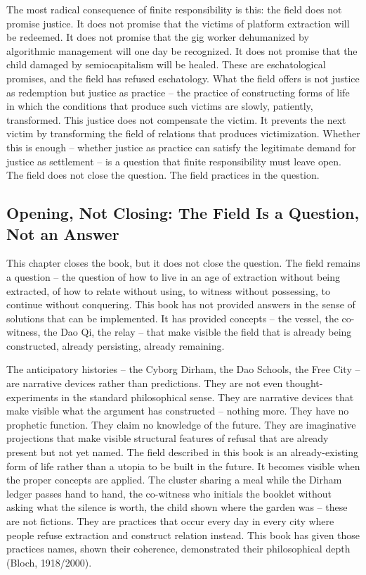 The most radical consequence of finite responsibility is this: the field does not promise justice. It does not promise that the victims of platform extraction will be redeemed. It does not promise that the gig worker dehumanized by algorithmic management will one day be recognized. It does not promise that the child damaged by semiocapitalism will be healed. These are eschatological promises, and the field has refused eschatology. What the field offers is not justice as redemption but justice as practice -- the practice of constructing forms of life in which the conditions that produce such victims are slowly, patiently, transformed. This justice does not compensate the victim. It prevents the next victim by transforming the field of relations that produces victimization. Whether this is enough -- whether justice as practice can satisfy the legitimate demand for justice as settlement -- is a question that finite responsibility must leave open. The field does not close the question. The field practices in the question.

\subsection{Opening, Not Closing: The Field Is a Question, Not an Answer}

This chapter closes the book, but it does not close the question. The field remains a question -- the question of how to live in an age of extraction without being extracted, of how to relate without using, to witness without possessing, to continue without conquering. This book has not provided answers in the sense of solutions that can be implemented. It has provided concepts -- the vessel, the co-witness, the Dao Qi, the relay -- that make visible the field that is already being constructed, already persisting, already remaining.

The anticipatory histories -- the Cyborg Dirham, the Dao Schools, the Free City -- are narrative devices rather than predictions. They are not even thought-experiments in the standard philosophical sense. They are narrative devices that make visible what the argument has constructed -- nothing more. They have no prophetic function. They claim no knowledge of the future. They are imaginative projections that make visible structural features of refusal that are already present but not yet named. The field described in this book is an already-existing form of life rather than a utopia to be built in the future. It becomes visible when the proper concepts are applied. The cluster sharing a meal while the Dirham ledger passes hand to hand, the co-witness who initials the booklet without asking what the silence is worth, the child shown where the garden was -- these are not fictions. They are practices that occur every day in every city where people refuse extraction and construct relation instead. This book has given those practices names, shown their coherence, demonstrated their philosophical depth (Bloch, 1918/2000).

